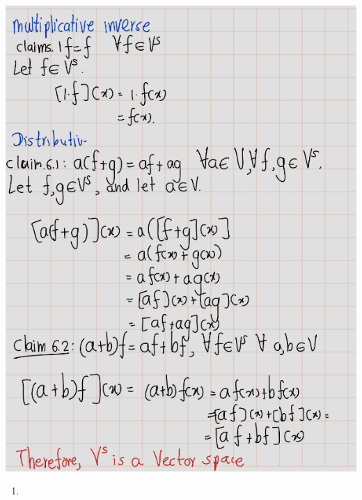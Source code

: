 \documentclass[
]{book}
\providecommand{\tightlist}{%
  \setlength{\itemsep}{0pt}\setlength{\parskip}{0pt}}
\theoremstyle{definition}
\theoremstyle{definition}
\theoremstyle{definition}
\theoremstyle{definition}
\theoremstyle{remark}
\begin{document}
\includegraphics[width=8.33in]{fig/Ex1B/Ex7-4}

\begin{enumerate}
\def\labelenumi{\arabic{enumi}.}
\setcounter{enumi}{7}
\tightlist
\item
\end{enumerate}
\end{document}
